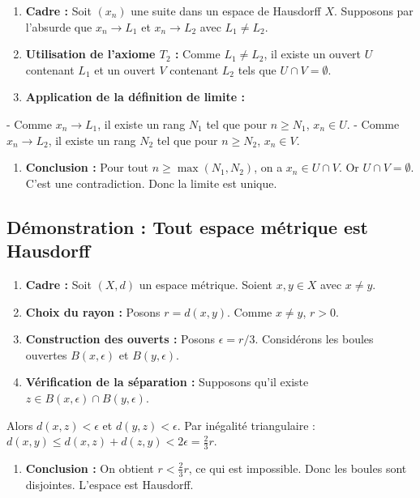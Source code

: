 \documentclass[11pt,a4paper]{article}
\begin{document}
\begin{enumerate}
\item \textbf{Cadre :} Soit $(x_n)$ une suite dans un espace de Hausdorff $X$. Supposons par l'absurde que $x_n \to L_1$ et $x_n \to L_2$ avec $L_1 \neq L_2$.

\item \textbf{Utilisation de l'axiome $T_2$ :} Comme $L_1 \neq L_2$, il existe un ouvert $U$ contenant $L_1$ et un ouvert $V$ contenant $L_2$ tels que $U \cap V = \emptyset$.

\item \textbf{Application de la définition de limite :}
\end{enumerate}
   - Comme $x_n \to L_1$, il existe un rang $N_1$ tel que pour $n \ge N_1$, $x_n \in U$.
   - Comme $x_n \to L_2$, il existe un rang $N_2$ tel que pour $n \ge N_2$, $x_n \in V$.
\begin{enumerate}
\item \textbf{Conclusion :} Pour tout $n \ge \max(N_1, N_2)$, on a $x_n \in U \cap V$. Or $U \cap V = \emptyset$. C'est une contradiction. Donc la limite est unique.
\end{enumerate}

\subsection{Démonstration : Tout espace métrique est Hausdorff}

\begin{enumerate}
\item \textbf{Cadre :} Soit $(X, d)$ un espace métrique. Soient $x, y \in X$ avec $x \neq y$.

\item \textbf{Choix du rayon :} Posons $r = d(x, y)$. Comme $x \neq y$, $r > 0$.

\item \textbf{Construction des ouverts :} Posons $\epsilon = r/3$. Considérons les boules ouvertes $B(x, \epsilon)$ et $B(y, \epsilon)$.

\item \textbf{Vérification de la séparation :} Supposons qu'il existe $z \in B(x, \epsilon) \cap B(y, \epsilon)$.
\end{enumerate}
   Alors $d(x, z) < \epsilon$ et $d(y, z) < \epsilon$.
   Par inégalité triangulaire : $d(x, y) \le d(x, z) + d(z, y) < 2\epsilon = \frac{2}{3} r$.
\begin{enumerate}
\item \textbf{Conclusion :} On obtient $r < \frac{2}{3} r$, ce qui est impossible. Donc les boules sont disjointes. L'espace est Hausdorff.
\end{enumerate}
\end{document}
